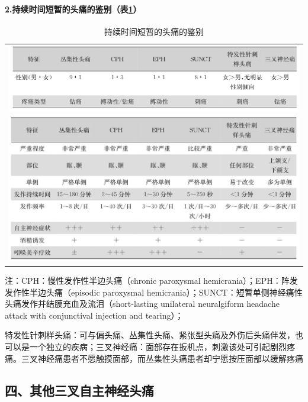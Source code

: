 \paragraph{2.持续时间短暂的头痛的鉴别（表\ref{tab46-16}）}

\begin{longtable}{c}
 \caption{持续时间短暂的头痛的鉴别}
 \label{tab46-16}
 \endfirsthead
 \caption[]{持续时间短暂的头痛的鉴别}
 \endhead
 \includegraphics[width=\textwidth,height=\textheight,keepaspectratio]{./images/Image00293.jpg}\\
 \includegraphics[width=\textwidth,height=\textheight,keepaspectratio]{./images/Image00294.jpg}
 \end{longtable}

注：CPH：慢性发作性半边头痛（chronic paroxysmal
hemicrania）；EPH：阵发发作性半边头痛（episodic paroxysmal
hemicrania）；SUNCT：短暂单侧神经痛性头痛发作并结膜充血及流泪（short-lasting
unilateral neuralgiform headache attack with conjunctival injection and
tearing）；

特发性针刺样头痛：可与偏头痛、丛集性头痛、紧张型头痛及外伤后头痛伴发，也可以是一个独立的疾病；三叉神经痛：面部存在扳机点，刺激该处可引起剧烈疼痛。三叉神经痛患者不愿触摸面部，而丛集性头痛患者却宁愿按压面部以缓解疼痛

\protect\hypertarget{text00350.html}{}{}

\subsection{四、其他三叉自主神经头痛}

